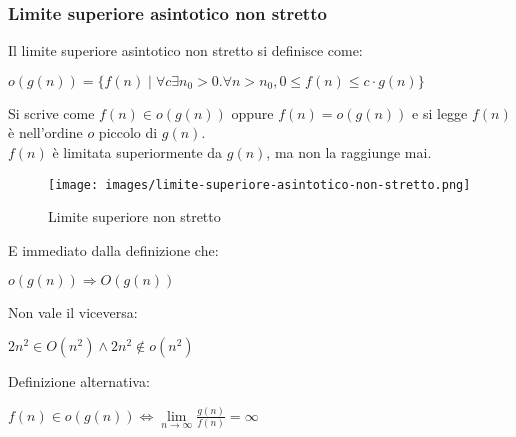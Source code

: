 \subsubsection{Limite superiore asintotico non stretto}
\begin{definition}
Il limite superiore asintotico non stretto si definisce come:
\begin{center}
    $o(g(n)) = \{f(n) \mid \forall c \exists n_0 > 0 . \forall n > n_0, 0 \leq f(n) \leq c \cdot g(n) \}$
\end{center}
\end{definition}
\hspace{-15pt}Si scrive come $f(n) \in o(g(n))$ oppure $f(n) = o(g(n))$ e si legge $f(n)$ è nell'ordine $o$ piccolo di $g(n)$.\\
$f(n)$ è limitata superiormente da $g(n)$, ma non la raggiunge mai.\\
\begin{wrapfigure}[7]{l}{7cm}
    \vspace{-15pt}
    \centering
    \texttt{[image: images/limite-superiore-asintotico-non-stretto.png]}
    \vspace{-5pt}
    \caption{Limite superiore non stretto}
\end{wrapfigure}

\vspace{-15pt}
E immediato dalla definizione che:
\begin{center}
    $o(g(n)) \Longrightarrow O(g(n))$
\end{center}
Non vale il viceversa: 
\begin{center}
    $2n^2 \in O(n^2) \land 2n^2 \notin o(n^2)$
\end{center}
Definizione alternativa:
\begin{center}
    $f(n) \in o(g(n)) \Longleftrightarrow \lim\limits_{n\to \infty}\frac{g(n)}{f(n)} = \infty$
\end{center}

